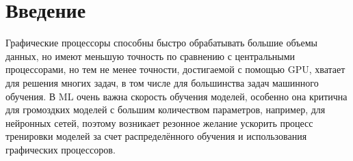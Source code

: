 \section{Введение}
Графические процессоры способны быстро обрабатывать большие объемы данных, но имеют меньшую точность по сравнению с центральными процессорами, но тем не менее точности, достигаемой с помощью GPU, хватает для решения многих задач, в том числе для большинства задач машинного обучения. В ML очень важна скорость обучения моделей, особенно она критична для громоздких моделей с большим количеством параметров, например, для нейронных сетей, поэтому возникает резонное желание ускорить процесс тренировки моделей за счет распределённого обучения и использования графических процессоров. 
